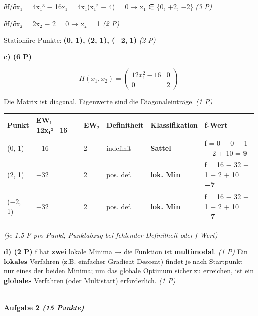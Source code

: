 \documentclass[11pt, a4paper]{article}
\begin{document}
∂f/∂x₁ = 4x₁³ − 16x₁ = 4x₁(x₁² − 4) = 0  →  x₁ ∈ \{0, +2, −2\} \textit{(3 P)}

∂f/∂x₂ = 2x₂ − 2 = 0  →  x₂ = 1 \textit{(2 P)}

Stationäre Punkte: \textbf{(0, 1), (2, 1), (−2, 1)} \textit{(2 P)}


\textbf{c) (6 P)}


\[
H(x_1,x_2) = \begin{pmatrix} 12x_1^2 - 16 & 0 \\ 0 & 2 \end{pmatrix}
\]


Die Matrix ist diagonal, Eigenwerte sind die Diagonaleinträge. \textit{(1 P)}



{\small
\begin{tabularx}{\linewidth}{XXXXXX}
\hline
\rowcolor{tableheadbg}
{\color{white}\textbf{Punkt}} & {\color{white}\textbf{EW₁ = 12x₁²−16}} & {\color{white}\textbf{EW₂}} & {\color{white}\textbf{Definitheit}} & {\color{white}\textbf{Klassifikation}} & {\color{white}\textbf{f-Wert}} \\[2pt]
\hline
\endhead
\hline
\endfoot
(0, 1) & −16 & 2 & indefinit & \textbf{Sattel} & f = 0 − 0 + 1 − 2 + 10 = \textbf{9} \\
(2, 1) & +32 & 2 & pos. def. & \textbf{lok. Min} & f = 16 − 32 + 1 − 2 + 10 = \textbf{−7} \\
(−2, 1) & +32 & 2 & pos. def. & \textbf{lok. Min} & f = 16 − 32 + 1 − 2 + 10 = \textbf{−7} \\
\end{tabularx}
}


\textit{(je 1.5 P pro Punkt; Punktabzug bei fehlender Definitheit oder f-Wert)}


\textbf{d) (2 P)} f hat \textbf{zwei} lokale Minima → die Funktion ist \textbf{multimodal}. \textit{(1 P)} Ein \textbf{lokales} Verfahren (z.B. einfacher Gradient Descent) findet je nach Startpunkt nur eines der beiden Minima; um das globale Optimum sicher zu erreichen, ist ein \textbf{globales} Verfahren (oder Multistart) erforderlich. \textit{(1 P)}



\noindent\textcolor{rulegray}{\rule{\linewidth}{0.4pt}}


\paragraph{Aufgabe 2 \textit{(15 Punkte)}}\mbox{}\\[2pt]
\end{document}
